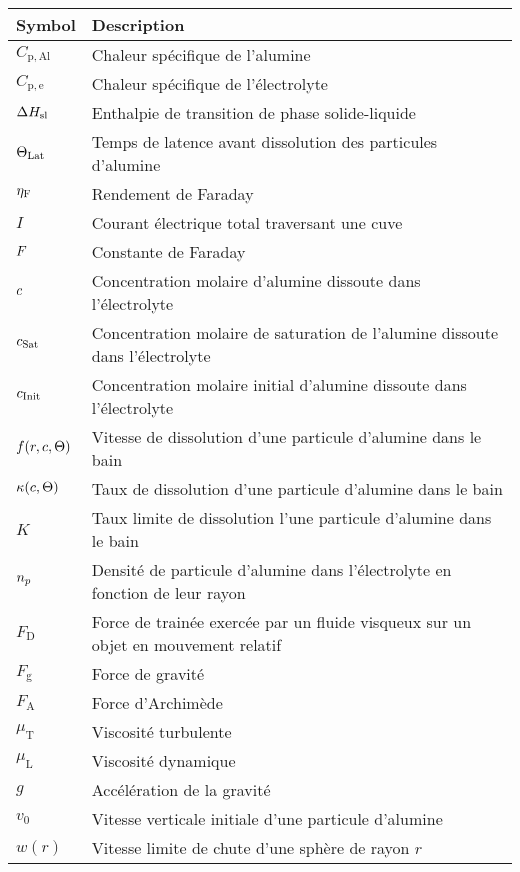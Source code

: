 \begin{tabularx}{\textwidth}{@{}lX@{}}
  \toprule
  Symbol & Description \\
  \midrule
  $C_\mathrm{p,Al}$ & Chaleur spécifique de l'alumine\\
  $C_\mathrm{p,e}$ & Chaleur spécifique de l'électrolyte\\
  $\Delta H_\mathrm{sl}$ & Enthalpie de transition de phase solide-liquide\\
  $\Theta_\text{Lat}$ & Temps de latence avant dissolution des particules d'alumine\\
  $\eta_\mathrm{F}$ & Rendement de Faraday\\
  $I$ & Courant électrique total traversant une cuve\\
  $F$ & Constante de Faraday\\
  $c$ & Concentration molaire d'alumine dissoute dans l'électrolyte\\
  $c_\text{Sat}$ & Concentration molaire de saturation de l'alumine dissoute dans l'électrolyte\\
  $c_\text{Init}$ & Concentration molaire initial d'alumine dissoute dans l'électrolyte\\
  $f(r, c,\Theta)$ & Vitesse de dissolution d'une particule d'alumine dans le bain\\
  $\kappa(c, \Theta)$ & Taux de dissolution d'une particule d'alumine dans le bain\\
  $K$ & Taux limite de dissolution l'une particule d'alumine dans le bain \\
  $n_p$ & Densité de particule d'alumine dans l'électrolyte en fonction de leur rayon\\
  $F_\mathrm{D}$ & Force de trainée exercée par un fluide visqueux sur un objet en mouvement relatif\\
  $F_\mathrm{g}$ & Force de gravité\\
  $F_\mathrm{A}$ & Force d'Archimède\\
  $\mu_\mathrm{T}$ & Viscosité turbulente\\
  $\mu_\mathrm{L}$ & Viscosité dynamique\\
  $g$ & Accélération de la gravité \\
  $v_0$ & Vitesse verticale initiale d'une particule d'alumine \\
  $w(r)$ & Vitesse limite de chute d'une sphère de rayon $r$\\

\end{tabularx}
